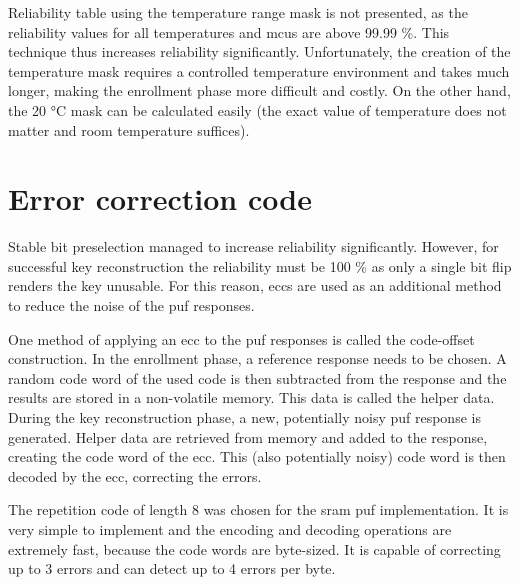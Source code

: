 Reliability table using the temperature range mask is not presented, as the reliability values for all temperatures and \glspl{mcu} are above 99.99 \%. This technique thus increases reliability significantly. Unfortunately, the creation of the temperature mask requires a controlled temperature environment and takes much longer, making the enrollment phase more difficult and costly. On the other hand, the 20 °C mask can be calculated easily (the exact value of temperature does not matter and room temperature suffices).


\section{Error correction code}\label{sec:ecc}

Stable bit preselection managed to increase reliability significantly. However, for successful key reconstruction the reliability must be 100 \% as only a single bit flip renders the key unusable. For this reason, \glspl{ecc} are used as an additional method to reduce the noise of the \gls{puf} responses.

One method of applying an \gls{ecc} to the \gls{puf} responses is called the code-offset construction. In the enrollment phase, a reference response needs to be chosen. A random code word of the used code is then subtracted from the response and the results are stored in a non-volatile memory. This data is called the helper data. During the key reconstruction phase, a new, potentially noisy \gls{puf} response is generated. Helper data are retrieved from memory and added to the response, creating the code word of the \gls{ecc}. This (also potentially noisy) code word is then decoded by the \gls{ecc}, correcting the errors.\cite{Sven2015}\cite{Dodis2008}

The repetition code of length 8 was chosen for the \gls{sram} \gls{puf} implementation. It is very simple to implement and the encoding and decoding operations are extremely fast, because the code words are byte-sized. It is capable of correcting up to 3 errors and can detect up to 4 errors per byte.

